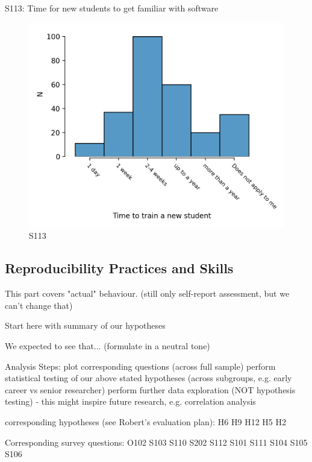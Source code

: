 \documentclass{article}
\begin{document}
S113: Time for new students to get familiar with software

\begin{figure}[!p]
    \centering
    \includegraphics[width=\textwidth]{../figs/S113.png}
	\caption{S113 }
    \label{fig:S113}
\end{figure}


\subsection{Reproducibility Practices and Skills}

This part covers "actual" behaviour. (still only self-report assessment, but we can't change that)

    Start here with summary of our hypotheses

We expected to see that... (formulate in a neutral tone)

    Analysis Steps:
        plot corresponding questions (across full sample)
        perform statistical testing of our above stated hypotheses (across subgroups, e.g. early career vs senior researcher)
        perform further data exploration (NOT hypothesis testing) - this might inspire future research, e.g. correlation analysis

    corresponding hypotheses (see Robert's evaluation plan):
        H6
        H9
        H12
        H5
        H2

Corresponding survey questions:
        O102
        S103
        S110
        S202
        S112
        S101
        S111
        S104
        S105
        S106
\end{document}
